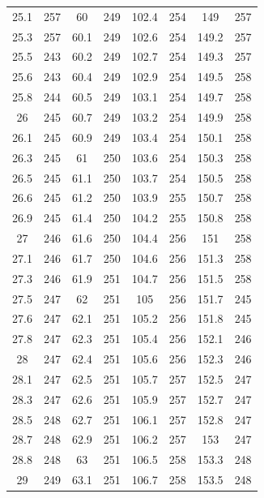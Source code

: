 \documentclass[12pt]{ctexart}
\numberwithin{equation}{section}
\begin{document}
\begin{longtable}{cc|cc|cc|cc}
25.1  &  257  &  60  &  249  &  102.4  &  254  &  149  &  257  \\
25.3  &  257  &  60.1  &  249  &  102.6  &  254  &  149.2  &  257  \\
25.5  &  243  &  60.2  &  249  &  102.7  &  254  &  149.3  &  257  \\
25.6  &  243  &  60.4  &  249  &  102.9  &  254  &  149.5  &  258  \\
25.8  &  244  &  60.5  &  249  &  103.1  &  254  &  149.7  &  258  \\
26  &  245  &  60.7  &  249  &  103.2  &  254  &  149.9  &  258  \\
26.1  &  245  &  60.9  &  249  &  103.4  &  254  &  150.1  &  258  \\
26.3  &  245  &  61  &  250  &  103.6  &  254  &  150.3  &  258  \\
26.5  &  245  &  61.1  &  250  &  103.7  &  254  &  150.5  &  258  \\
26.6  &  245  &  61.2  &  250  &  103.9  &  255  &  150.7  &  258  \\
26.9  &  245  &  61.4  &  250  &  104.2  &  255  &  150.8  &  258  \\
27  &  246  &  61.6  &  250  &  104.4  &  256  &  151  &  258  \\
27.1  &  246  &  61.7  &  250  &  104.6  &  256  &  151.3  &  258  \\
27.3  &  246  &  61.9  &  251  &  104.7  &  256  &  151.5  &  258  \\
27.5  &  247  &  62  &  251  &  105  &  256  &  151.7  &  245  \\
27.6  &  247  &  62.1  &  251  &  105.2  &  256  &  151.8  &  245  \\
27.8  &  247  &  62.3  &  251  &  105.4  &  256  &  152.1  &  246  \\
28  &  247  &  62.4  &  251  &  105.6  &  256  &  152.3  &  246  \\
28.1  &  247  &  62.5  &  251  &  105.7  &  257  &  152.5  &  247  \\
28.3  &  247  &  62.6  &  251  &  105.9  &  257  &  152.7  &  247  \\
28.5  &  248  &  62.7  &  251  &  106.1  &  257  &  152.8  &  247  \\
28.7  &  248  &  62.9  &  251  &  106.2  &  257  &  153  &  247  \\
28.8  &  248  &  63  &  251  &  106.5  &  258  &  153.3  &  248  \\
29  &  249  &  63.1  &  251  &  106.7  &  258  &  153.5  &  248  \\

\end{longtable}
\end{document}
